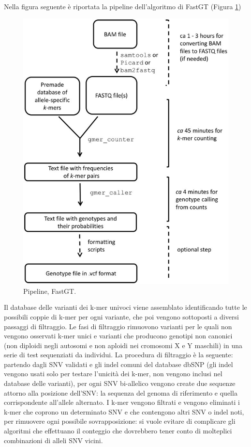 \documentclass[../main.tex]{subfiles}
\begin{document}
Nella figura seguente è riportata la pipeline dell'algoritmo di FastGT (Figura \ref{fig:fastgt})

 \begin{figure}[h!]
	\centering
  	\captionsetup{justification=centering}
  	\includegraphics[scale=.25]{images/fastgt-pipeline.jpg}
  	\caption{Pipeline, FastGT.}
  	\label{fig:fastgt}
\end{figure}

\noindent
Il database delle varianti dei k-mer univoci viene assemblato identificando tutte le possibili coppie di k-mer per ogni variante, che poi vengono sottoposti a diversi passaggi di filtraggio. Le fasi di filtraggio rimuovono varianti per le quali non vengono osservati k-mer unici e varianti che producono genotipi non canonici (non diploidi negli autosomi e non aploidi nei cromosomi X e Y maschili) in una serie di test sequenziati da individui. La procedura di filtraggio è la seguente: partendo dagli SNV validati e gli indel comuni del database dbSNP (gli indel vengono usati solo per testare l'unicità dei k-mer, non vengono inclusi nel database delle varianti), per ogni SNV bi-allelico vengono create due sequenze attorno alla posizione dell'SNV: la sequenza del genoma di riferimento e quella corrispondente all'allele alternato. I k-mer vengono filtrati e vengono eliminati i k-mer che coprono un determinato SNV e che contengono altri SNV o indel noti, per rimuovere ogni possibile sovrapposizione: si vuole evitare di complicare gli algoritmi che effettuano il conteggio che dovrebbero tener conto di molteplici combinazioni di alleli SNV vicini. 
\end{document}
